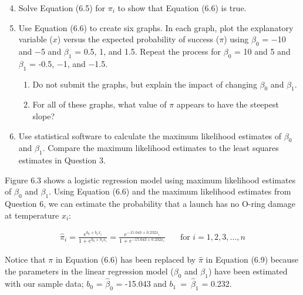 \documentclass[
]{report}
\begin{document}
\begin{enumerate}
  \setcounter{enumi}{3}

  \item  Solve Equation (6.5) for $\scriptstyle \pi_i$ to show that Equation (6.6) is true.  

  \item  Use Equation (6.6) to create six graphs. In each graph, plot the explanatory variable ($\scriptstyle x$) versus the expected probability of success ($\scriptstyle \pi$) using $\scriptstyle \beta_0$ = $-$10 and $-$5 and $\scriptstyle \beta_1$ = 0.5, 1, and 1.5. Repeat the process for $\scriptstyle \beta_0$ = 10 and 5 and $\scriptstyle \beta_1$ = -0.5, $-$1, and $-$1.5. 
  \begin{enumerate}
  \item Do not submit the graphs, but explain the impact of changing $\scriptstyle \beta_0$ and $\scriptstyle \beta_1$.  
   \item  For all of these graphs, what value of $\scriptstyle \pi$ appears to have the steepest slope?  
  \end{enumerate}
  
\item Use statistical software to calculate the maximum likelihood estimates of $\scriptstyle \beta_0$ and $\scriptstyle \beta_1$. Compare the maximum likelihood estimates to the least squares estimates in Question 3.

\end{enumerate}

Figure 6.3 shows a logistic regression model using maximum likelihood estimates of \(\scriptstyle \beta_0\) and \(\scriptstyle \beta_1\). Using Equation (6.6) and the maximum likelihood estimates from Question 6, we can estimate the probability that a launch has no O-ring damage at temperature \(\scriptstyle x_i\):

\begin{align}
\hat\pi_i 
= \frac{e^{b_0 + b_1 x_i}}{1 + e^{b_0 + b_1 x_i}} = \frac{e^{-15.043 + 0.232 x_i}}{1 + e^{-15.043 + 0.232 x_i}}
&\quad \text{for } i = 1,2,3,\dots,n 
\tag{6.9}
\end{align}

Notice that \(\scriptstyle \pi\) in Equation (6.6) has been replaced by \(\scriptstyle \hat\pi\) in Equation (6.9) because the parameters in the linear regression model (\(\scriptstyle \beta_0\) and \(\scriptstyle \beta_1\)) have been estimated with our sample data; \(\scriptstyle b_0\) = \(\scriptstyle \hat\beta_0\) = -15.043 and \(\scriptstyle b_1 \ = \ \hat\beta_1\) = 0.232.
\end{document}
